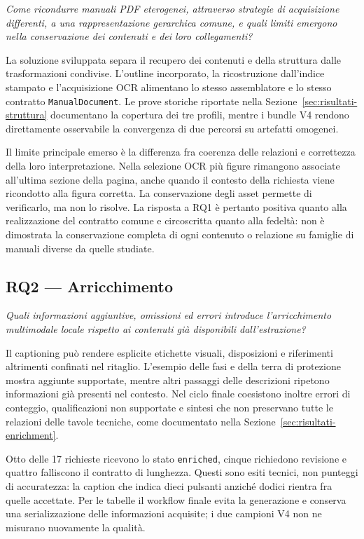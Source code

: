 \emph{Come ricondurre manuali PDF eterogenei, attraverso strategie di acquisizione differenti, a una rappresentazione gerarchica comune, e quali limiti emergono nella conservazione dei contenuti e dei loro collegamenti?}

La soluzione sviluppata separa il recupero dei contenuti e della struttura dalle trasformazioni condivise. L'outline incorporato, la ricostruzione dall'indice stampato e l'acquisizione OCR alimentano lo stesso assemblatore e lo stesso contratto \texttt{ManualDocument}. Le prove storiche riportate nella Sezione~\ref{sec:risultati-struttura} documentano la copertura dei tre profili, mentre i bundle V4 rendono direttamente osservabile la convergenza di due percorsi su artefatti omogenei.

Il limite principale emerso è la differenza fra coerenza delle relazioni e correttezza della loro interpretazione. Nella selezione OCR più figure rimangono associate all'ultima sezione della pagina, anche quando il contesto della richiesta viene ricondotto alla figura corretta. La conservazione degli asset permette di verificarlo, ma non lo risolve. La risposta a RQ1 è pertanto positiva quanto alla realizzazione del contratto comune e circoscritta quanto alla fedeltà: non è dimostrata la conservazione completa di ogni contenuto o relazione su famiglie di manuali diverse da quelle studiate.

\subsection{RQ2 --- Arricchimento}

\emph{Quali informazioni aggiuntive, omissioni ed errori introduce l'arricchimento multimodale locale rispetto ai contenuti già disponibili dall'estrazione?}

Il captioning può rendere esplicite etichette visuali, disposizioni e riferimenti altrimenti confinati nel ritaglio. L'esempio delle fasi e della terra di protezione mostra aggiunte supportate, mentre altri passaggi delle descrizioni ripetono informazioni già presenti nel contesto. Nel ciclo finale coesistono inoltre errori di conteggio, qualificazioni non supportate e sintesi che non preservano tutte le relazioni delle tavole tecniche, come documentato nella Sezione~\ref{sec:risultati-enrichment}.

Otto delle 17 richieste ricevono lo stato \texttt{enriched}, cinque richiedono revisione e quattro falliscono il contratto di lunghezza. Questi sono esiti tecnici, non punteggi di accuratezza: la caption che indica dieci pulsanti anziché dodici rientra fra quelle accettate. Per le tabelle il workflow finale evita la generazione e conserva una serializzazione delle informazioni acquisite; i due campioni V4 non ne misurano nuovamente la qualità.

